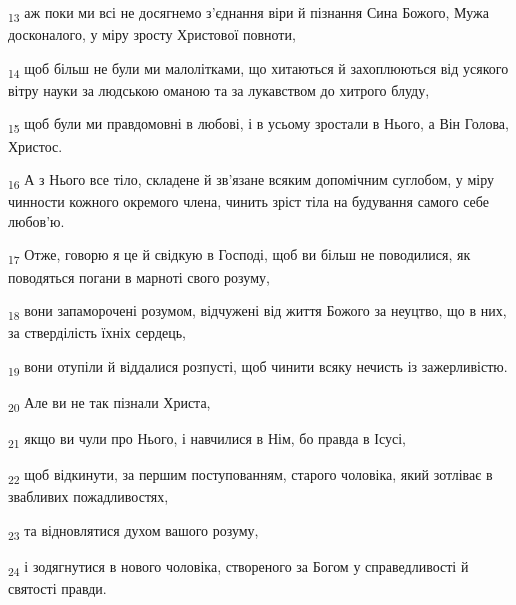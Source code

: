 \begin{tcolorbox}
\textsubscript{13} аж поки ми всі не досягнемо з'єднання віри й пізнання Сина Божого, Мужа досконалого, у міру зросту Христової повноти,
\end{tcolorbox}
\begin{tcolorbox}
\textsubscript{14} щоб більш не були ми малолітками, що хитаються й захоплюються від усякого вітру науки за людською оманою та за лукавством до хитрого блуду,
\end{tcolorbox}
\begin{tcolorbox}
\textsubscript{15} щоб були ми правдомовні в любові, і в усьому зростали в Нього, а Він Голова, Христос.
\end{tcolorbox}
\begin{tcolorbox}
\textsubscript{16} А з Нього все тіло, складене й зв'язане всяким допомічним суглобом, у міру чинности кожного окремого члена, чинить зріст тіла на будування самого себе любов'ю.
\end{tcolorbox}
\begin{tcolorbox}
\textsubscript{17} Отже, говорю я це й свідкую в Господі, щоб ви більш не поводилися, як поводяться погани в марноті свого розуму,
\end{tcolorbox}
\begin{tcolorbox}
\textsubscript{18} вони запаморочені розумом, відчужені від життя Божого за неуцтво, що в них, за стверділість їхніх сердець,
\end{tcolorbox}
\begin{tcolorbox}
\textsubscript{19} вони отупіли й віддалися розпусті, щоб чинити всяку нечисть із зажерливістю.
\end{tcolorbox}
\begin{tcolorbox}
\textsubscript{20} Але ви не так пізнали Христа,
\end{tcolorbox}
\begin{tcolorbox}
\textsubscript{21} якщо ви чули про Нього, і навчилися в Нім, бо правда в Ісусі,
\end{tcolorbox}
\begin{tcolorbox}
\textsubscript{22} щоб відкинути, за першим поступованням, старого чоловіка, який зотліває в звабливих пожадливостях,
\end{tcolorbox}
\begin{tcolorbox}
\textsubscript{23} та відновлятися духом вашого розуму,
\end{tcolorbox}
\begin{tcolorbox}
\textsubscript{24} і зодягнутися в нового чоловіка, створеного за Богом у справедливості й святості правди.
\end{tcolorbox}
